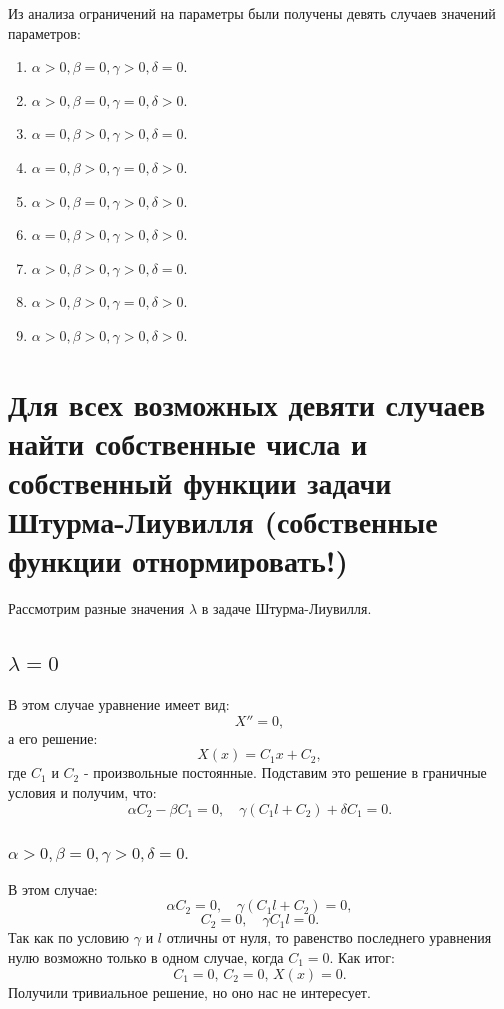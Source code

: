\documentclass[12pt, a4paper]{article}
\begin{document}
Из анализа ограничений на параметры были получены девять случаев значений параметров:
\begin{enumerate}
	\item $ \alpha > 0, \beta = 0, \gamma > 0, \delta = 0. $
	\item $ \alpha > 0, \beta = 0, \gamma = 0, \delta > 0. $
	\item $ \alpha = 0, \beta > 0, \gamma > 0, \delta = 0. $
	\item $ \alpha = 0, \beta > 0, \gamma = 0, \delta > 0. $
	\item $ \alpha > 0, \beta = 0, \gamma > 0, \delta > 0. $
	\item $ \alpha = 0, \beta > 0, \gamma > 0, \delta > 0. $
	\item $ \alpha > 0, \beta > 0, \gamma > 0, \delta = 0. $
	\item $ \alpha > 0, \beta > 0, \gamma = 0, \delta > 0. $
	\item $ \alpha > 0, \beta > 0, \gamma > 0, \delta > 0. $
\end{enumerate}


\section{Для всех возможных девяти случаев найти собственные числа и собственный функции задачи Штурма-Лиувилля (собственные функции отнормировать!)}
Рассмотрим разные значения $\lambda$ в задаче Штурма-Лиувилля.
\subsection{$\lambda = 0$}
В этом случае уравнение имеет вид:
\[ X'' = 0, \]
а его решение:
\[ X(x) = C_{1} x + C_{2}, \]
где $C_{1}$ и $C_{2}$ - произвольные постоянные. Подставим это решение в граничные условия и получим, что:
\[\alpha C_{2} - \beta C_{1} = 0, \quad \gamma (C_{1} l + C_{2}) + \delta C_{1} = 0. \]

\subsubsection{ $ \alpha > 0, \beta = 0, \gamma > 0, \delta = 0. $}
В этом случае:
\[\alpha C_{2} = 0, \quad \gamma (C_{1} l + C_{2}) = 0, \]
\[ C_{2} = 0, \quad  \gamma C_{1} l = 0. \]
Так как по условию $\gamma$ и $l$ отличны от нуля, то равенство последнего уравнения нулю возможно только в одном случае, когда $C_{1} = 0$. Как итог:
\[ C_{1} = 0, \, C_{2} = 0, \, X(x) = 0. \]
Получили тривиальное решение, но оно нас не интересует.
\end{document}
